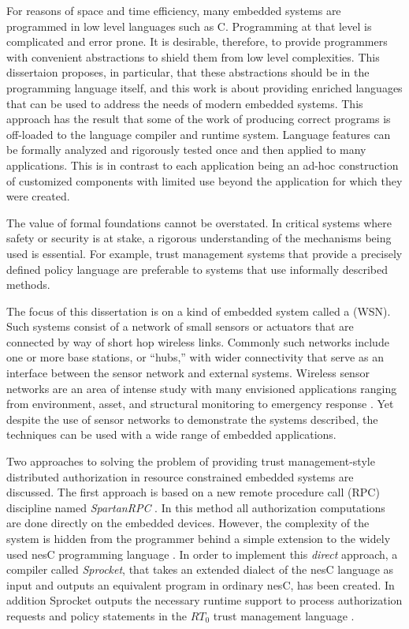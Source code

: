 For reasons of space and time efficiency, many embedded systems are programmed in low level
languages such as C. Programming at that level is complicated and error prone. It is desirable,
therefore, to provide programmers with convenient abstractions to shield them from low level
complexities. This dissertaion proposes, in particular, that these abstractions should be in the
programming language itself, and this work is about providing enriched languages that can be used
to address the needs of modern embedded systems. This  approach has the
result that some of the work of producing correct programs is off-loaded to the language
compiler and runtime system. Language features can be formally analyzed and rigorously tested
once and then applied to many applications. This is in contrast to each application being an
ad-hoc construction of customized components with limited use beyond the application for which
they were created. 

The value of formal foundations cannot be overstated. In critical systems where safety or
security is at stake, a rigorous understanding of the mechanisms being used is essential. For
example, trust management systems that provide a precisely defined policy language are
preferable to systems that use informally described methods.

The focus of this dissertation is on a kind of embedded system called a  (WSN). Such systems consist of a network of small sensors or actuators that are
connected by way of short hop wireless links. Commonly such networks include one or more base
stations, or ``hubs,'' with wider connectivity that serve as an interface between the sensor
network and external systems. Wireless sensor networks are an area of intense study with many
envisioned applications ranging from environment, asset, and structural monitoring to emergency
response \cite{Culler:2004:GEI:1018015.1018072,1038146}. Yet despite the use of sensor networks
to demonstrate the systems described, the techniques can be used with a wide range of embedded
applications.

Two approaches to solving the problem of providing trust management-style distributed
authorization in resource constrained embedded systems are discussed. The first approach is
based on a new remote procedure call (RPC) discipline named \textit{SpartanRPC}
\cite{chapin-skalka-SpartanRPC,chapin-skalka-SpartanRPCTR}. In this method all authorization
computations are done directly on the embedded devices. However, the complexity of the system is
hidden from the programmer behind a simple extension to the widely used nesC programming
language \cite{Gay-nesC-2003}. In order to implement this \emph{direct} approach, a compiler
called \textit{Sprocket}, that takes an extended dialect of the nesC language as input and
outputs an equivalent program in ordinary nesC, has been created. In addition Sprocket outputs
the necessary runtime support to process authorization requests and policy statements in the
$RT_0$ trust management language \cite{Li:DRBTMF,Li:RRBTMF}.

